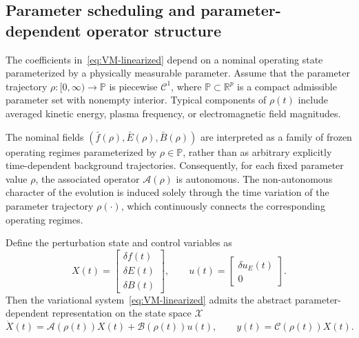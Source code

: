 \documentclass[AMA,Times2COL]{WileyNJDv5}
\begin{document}
\subsection{Parameter scheduling and parameter-dependent operator structure}


The coefficients in~\eqref{eq:VM-linearized} depend on a nominal operating state parameterized by a physically measurable parameter.
Assume that the parameter trajectory
$\rho:[0,\infty)\to\mathbb P$ is piecewise $\mathcal C^1$, where $\mathbb P\subset\mathbb R^p$ is a compact admissible parameter set with nonempty interior. Typical components of $\rho(t)$ include averaged kinetic energy, plasma frequency, or electromagnetic field magnitudes.

The nominal fields
\(
(\bar f(\rho),\bar E(\rho),\bar B(\rho))
\)
are interpreted as a family of frozen operating regimes parameterized by \(\rho\in\mathbb P\), rather than as arbitrary explicitly time-dependent background trajectories. Consequently, for each fixed parameter value
\(\rho\), the associated operator \(\mathcal A(\rho)\) is autonomous.
The non-autonomous character of the evolution is induced solely through the time variation of the parameter trajectory \(\rho(\cdot)\), which continuously connects the corresponding operating regimes.


\smallskip
Define the perturbation state and control variables as
\[
X(t)=
\begin{bmatrix}
\delta f(t)\\[0.2em]
\delta E(t)\\[0.2em]
\delta B(t)
\end{bmatrix},
\qquad
u(t)=
\begin{bmatrix}
\delta u_E(t)\\[0.2em]
0
\end{bmatrix}.
\]
Then the variational system~\eqref{eq:VM-linearized} admits the abstract parameter-dependent representation on the state space $\mathscr{X}$
\begin{equation}\label{eq:LPV-abstract}
\dot X(t)=\mathcal{A}(\rho(t))X(t)+\mathcal{B}(\rho(t))u(t),
\qquad
y(t)=\mathcal{C}(\rho(t))X(t).
\end{equation}
\end{document}
